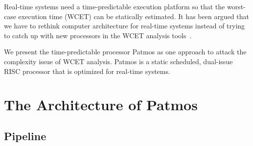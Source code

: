 \documentclass[a4paper,fontsize=10pt,twoside,DIV15,BCOR12mm,headinclude=true,footinclude=false,pagesize,bibtotoc]{scrbook}
\newcommand{\comment}[3]{

\textsf{\textbf{#1}} {\color{#3}#2}}
\newcommand{\martin}[1]{\comment{Martin}{#1}{Blue}}
\newcommand{\fb}[1]{\comment{Florian}{#1}{Emerald}}
\renewcommand{\martin}[1]{}
\renewcommand{\fb}[1]{}
\begin{document}
Real-time systems need a time-predictable execution platform so that the worst-case execution time (WCET) can be statically estimated. It has been argued that we have to rethink computer architecture for real-time systems instead of trying to catch up with new processors in the WCET analysis tools~\cite{tpca:jes, pret:dac2007}.

We present the time-predictable processor Patmos as one approach to attack the complexity issue of WCET analysis. Patmos is a static scheduled, dual-issue RISC processor that is optimized for real-time systems.

\martin{This report shall converge towards a real manual. At the moment it serves
discussion well, but we shall keep this in mind. Here a starting list of TODOs:

\begin{itemize}
\item Send an email to all and ask about cleanup of some discussion points
\item Convert some discussion text into readable sections and argue why we
did what we did
\item Get a nice introduction and a good architecture section written
\end{itemize}

}



\fb{Martin wishes that Patmos will not require more than 3000 LC ;-)}
\martin{And fmax shall not be below 80\% of NIOS or MicroBlaze.
And performance (also average case ;-) shall be better, compared to NIOS/MB.
And we could compare against Tommy's YARI.}

\martin{TODO: The instruction description with the individual pipeline stages shall be
rewritten to reflect the actual simulator and hardware implementation of Patmos.
E.g. predicate registers are *not* read in the decode stage, but directly in EX.
Reading in decode would mean a one cycle generate use delay.}


\chapter{The Architecture of Patmos}
\label{sec:arch}

\section{Pipeline}
\end{document}
